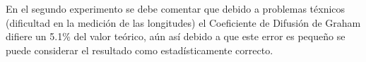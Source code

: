 \documentclass[../main.tex]{subfiles}
\begin{document}
En el segundo experimento se debe comentar que debido a problemas téxnicos
(dificultad en la medición de las longitudes) el Coeficiente de Difusión de Graham
difiere un 5.1\% del valor teórico, aún así debido a que este error es pequeño
se puede considerar el resultado como estadísticamente correcto. 
\end{document}
